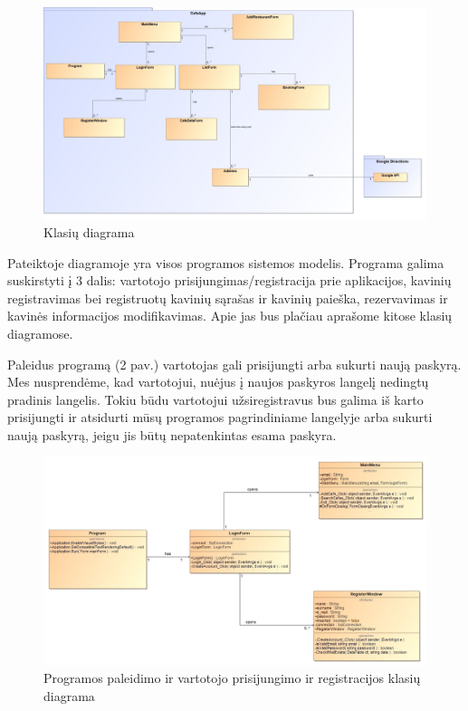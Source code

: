 \documentclass{VUMIFPSkursinis}
\begin{document}
\begin{figure}[H]
    \centering
    \includegraphics[width=\textwidth,height=\textheight,keepaspectratio]{img/Model} 
    \caption{Klasių diagrama}
    \label{img:Model}
\end{figure}
Pateiktoje diagramoje yra visos programos sistemos modelis. Programa galima suskirstyti į 3 dalis: vartotojo prisijungimas/registracija prie aplikacijos, kavinių registravimas bei registruotų kavinių sąrašas ir kavinių paieška, rezervavimas ir kavinės informacijos modifikavimas. Apie jas bus plačiau aprašome kitose klasių diagramose.
\pagebreak

Paleidus programą (2 pav.) vartotojas gali prisijungti arba sukurti naują paskyrą. Mes nusprendėme, kad vartotojui, nuėjus į naujos paskyros langelį nedingtų pradinis langelis. Tokiu būdu vartotojui užsiregistravus bus galima iš karto prisijungti ir atsidurti mūsų programos pagrindiniame langelyje arba sukurti naują paskyrą, jeigu jis būtų nepatenkintas esama paskyra. 
\newline
\newline
\newline
\newline
\newline
\newline
\begin{figure}[H]
    \centering
    \includegraphics[width=\textwidth,height=\textheight,keepaspectratio]{img/Program_LoginForm_Register_MainMenu} 
    \caption{Programos paleidimo ir vartotojo prisijungimo ir registracijos  klasių diagrama}
    \label{img:Program_LoginForm_Register_MainMenu}
\end{figure}
\end{document}
